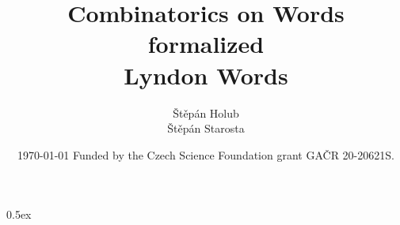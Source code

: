 \documentclass[11pt,a4paper]{report}
\begin{document}
\title{Combinatorics on Words formalized \\ Lyndon Words}
\author{Štěpán Holub \\ Štěpán Starosta }
  

 \date{ \today
 \vfill
  Funded by the Czech Science Foundation grant GA\v CR 20-20621S.}
  
\maketitle


\tableofcontents
\vspace{\baselineskip}

\parindent 0pt\parskip 0.5ex



\cleardoublepage
{}
\renewcommand{\bibname}{References}


\end{document}
